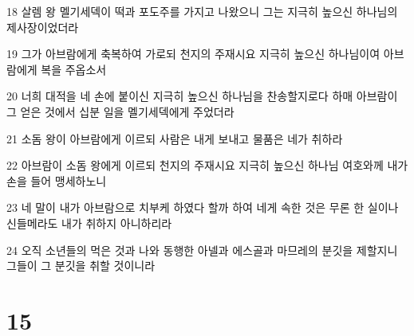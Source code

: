 \par 18 살렘 왕 멜기세덱이 떡과 포도주를 가지고 나왔으니 그는 지극히 높으신 하나님의 제사장이었더라
\par 19 그가 아브람에게 축복하여 가로되 천지의 주재시요 지극히 높으신 하나님이여 아브람에게 복을 주옵소서
\par 20 너희 대적을 네 손에 붙이신 지극히 높으신 하나님을 찬송할지로다 하매 아브람이 그 얻은 것에서 십분 일을 멜기세덱에게 주었더라
\par 21 소돔 왕이 아브람에게 이르되 사람은 내게 보내고 물품은 네가 취하라
\par 22 아브람이 소돔 왕에게 이르되 천지의 주재시요 지극히 높으신 하나님 여호와께 내가 손을 들어 맹세하노니
\par 23 네 말이 내가 아브람으로 치부케 하였다 할까 하여 네게 속한 것은 무론 한 실이나 신들메라도 내가 취하지 아니하리라
\par 24 오직 소년들의 먹은 것과 나와 동행한 아넬과 에스골과 마므레의 분깃을 제할지니 그들이 그 분깃을 취할 것이니라

\chapter{15}

